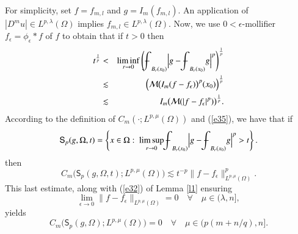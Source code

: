 \documentclass[12pt]{amsart}
\begin{document}
For simplicity, set $f=f_{m,l}$ and $g=I_m(f_{m,l})$. An application of $|D^m u|\in L^{p,\lambda}(\Omega)$ implies $f_{m,l}\in
L^{p,\lambda}(\Omega)$. Now, we use $0<\epsilon$-mollifier $f_{\epsilon}=\phi_\epsilon\ast f$ of $f$ to obtain that if $t>0$ then
\begin{eqnarray*}
t^\frac1p&<&\liminf_{r\to 0} \left({{\mathchoice
{{{\setbox0=\hbox{$\displaystyle{\textstyle{-}}{\int}$ }
\vcenter{\hbox{$\textstyle{-}$ }}\kern-.6\wd0}}}{{{\setbox0=\hbox{$\textstyle{\scriptstyle{-}}{\int}$ }
\vcenter{\hbox{$\scriptstyle{-}$ }}\kern-.6\wd0}}}{{{\setbox0=\hbox{$\scriptstyle{\scriptscriptstyle{-}}{\int}$ }
\vcenter{\hbox{$\scriptscriptstyle{-}$ }}\kern-.6\wd0}}}{{{\setbox0=\hbox{$\scriptscriptstyle{\scriptscriptstyle{-}}{\int}$ }
\vcenter{\hbox{$\scriptscriptstyle{-}$ }}\kern-.6\wd0}}}\!\int}}_{B_r(x_0)}\Big|g -{{\mathchoice
{{{\setbox0=\hbox{$\displaystyle{\textstyle{-}}{\int}$ }
\vcenter{\hbox{$\textstyle{-}$ }}\kern-.6\wd0}}}{{{\setbox0=\hbox{$\textstyle{\scriptstyle{-}}{\int}$ }
\vcenter{\hbox{$\scriptstyle{-}$ }}\kern-.6\wd0}}}{{{\setbox0=\hbox{$\scriptstyle{\scriptscriptstyle{-}}{\int}$ }
\vcenter{\hbox{$\scriptscriptstyle{-}$ }}\kern-.6\wd0}}}{{{\setbox0=\hbox{$\scriptscriptstyle{\scriptscriptstyle{-}}{\int}$ }
\vcenter{\hbox{$\scriptscriptstyle{-}$ }}\kern-.6\wd0}}}\!\int}}_{B_r(x_0)}g\Big|^p\right)^\frac1p\\
&\lesssim&\Big(\mathcal{M}\big(I_{m}(f-f_{\epsilon})\big)^p(x_0)\Big)^\frac1p\\
&\lesssim&I_m\big(\mathcal{M}(|f-f_\epsilon|^p)\big)^\frac1p.
\end{eqnarray*}
According to the definition of $C_m(\cdot; L^{p,\mu}(\Omega))$ and (\ref{e35}), we have that if
$$
\mathsf{S}_p(g,\Omega,t)=\left\{x\in\Omega:\ \limsup_{r\to
0}{{\mathchoice
{{{\setbox0=\hbox{$\displaystyle{\textstyle{-}}{\int}$ }
\vcenter{\hbox{$\textstyle{-}$ }}\kern-.6\wd0}}}{{{\setbox0=\hbox{$\textstyle{\scriptstyle{-}}{\int}$ }
\vcenter{\hbox{$\scriptstyle{-}$ }}\kern-.6\wd0}}}{{{\setbox0=\hbox{$\scriptstyle{\scriptscriptstyle{-}}{\int}$ }
\vcenter{\hbox{$\scriptscriptstyle{-}$ }}\kern-.6\wd0}}}{{{\setbox0=\hbox{$\scriptscriptstyle{\scriptscriptstyle{-}}{\int}$ }
\vcenter{\hbox{$\scriptscriptstyle{-}$ }}\kern-.6\wd0}}}\!\int}}_{B_r(x_0)}\Big|g-{{\mathchoice
{{{\setbox0=\hbox{$\displaystyle{\textstyle{-}}{\int}$ }
\vcenter{\hbox{$\textstyle{-}$ }}\kern-.6\wd0}}}{{{\setbox0=\hbox{$\textstyle{\scriptstyle{-}}{\int}$ }
\vcenter{\hbox{$\scriptstyle{-}$ }}\kern-.6\wd0}}}{{{\setbox0=\hbox{$\scriptstyle{\scriptscriptstyle{-}}{\int}$ }
\vcenter{\hbox{$\scriptscriptstyle{-}$ }}\kern-.6\wd0}}}{{{\setbox0=\hbox{$\scriptscriptstyle{\scriptscriptstyle{-}}{\int}$ }
\vcenter{\hbox{$\scriptscriptstyle{-}$ }}\kern-.6\wd0}}}\!\int}}_{B_r(x_0)}g\Big|^p>t\right\}.
$$
then
$$
C_m\big(\mathsf{S}_p(g,\Omega,t);L^{p,\mu}(\Omega)\big)\lesssim t^{-p}\|f-f_\epsilon\|_{L^{p,\mu}(\Omega)}^p.
$$
This last estimate, along with (\ref{e32}) of Lemma \ref{l1} ensuring
$$
\lim_{\epsilon\to 0}\|f-f_{\epsilon}\|_{L^{p,
\mu}(\Omega)}=0\quad\forall\quad\mu\in (\lambda,n],
$$
yields
\begin{equation}\label{e37}
  C_m\big(\mathsf{S}_p(g,\Omega); L^{p,\mu}(\Omega)\big)=0\quad{\forall}\quad \mu\in (p(m+n/q),n].
  \end{equation}
\end{document}
